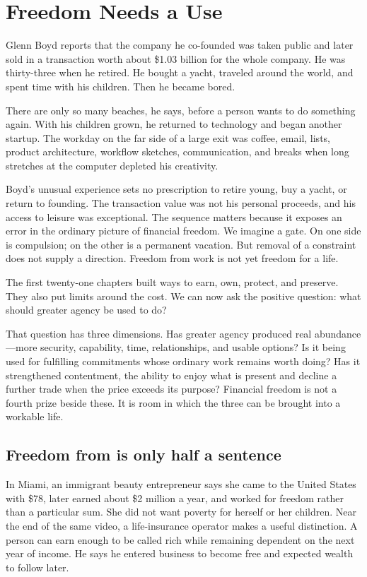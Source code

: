 \chapter{Freedom Needs a Use}

Glenn Boyd reports that the company he co-founded was taken public and later
sold in a transaction worth about \$1.03 billion for the whole company. He was
thirty-three when he retired. He bought a yacht, traveled around the world,
and spent time with his children. Then he became bored.

There are only so many beaches, he says, before a person wants to do something
again. With his children grown, he returned to technology and began another
startup. The workday on the far side of a large exit was coffee, email, lists,
product architecture, workflow sketches, communication, and breaks when long
stretches at the computer depleted his creativity.

Boyd's unusual experience sets no prescription to retire young, buy a yacht,
or return to founding. The transaction value was not his personal proceeds,
and his access to leisure was exceptional. The sequence matters because it
exposes an error in the ordinary picture of financial freedom. We imagine a gate. On
one side is compulsion; on the other is a permanent vacation. But removal of a
constraint does not supply a direction. Freedom from work is not yet freedom
for a life.

The first twenty-one chapters built ways to earn, own, protect, and preserve.
They also put limits around the cost. We can now ask the positive question:
what should greater agency be used to do?

That question has three dimensions. Has greater agency produced real
abundance---more security, capability, time, relationships, and usable options?
Is it being used for fulfilling commitments whose ordinary work remains worth
doing? Has it strengthened contentment, the ability to enjoy what is present
and decline a further trade when the price exceeds its purpose? Financial
freedom is not a fourth prize beside these. It is room in which the three can
be brought into a workable life.

\section{Freedom from is only half a sentence}

In Miami, an immigrant beauty entrepreneur says she came to the United States
with \$78, later earned about \$2 million a year, and worked for freedom rather
than a particular sum. She did not want poverty for herself or her children.
Near the end of the same video, a life-insurance operator makes a useful
distinction. A person can earn enough to be called rich while remaining
dependent on the next year of income. He says he entered business to become
free and expected wealth to follow later.

